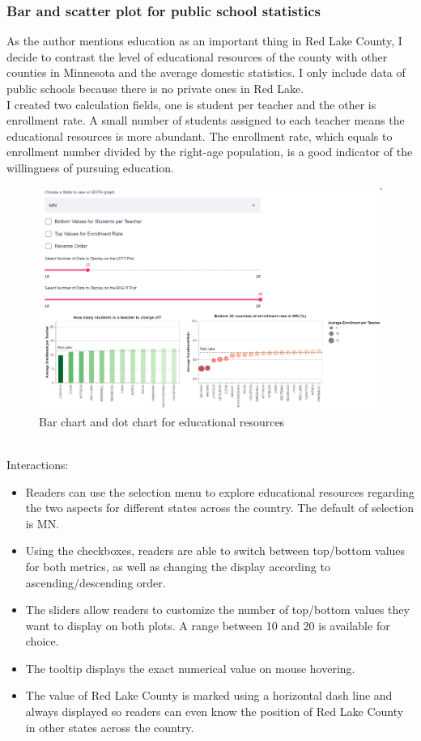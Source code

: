 \documentclass{article}
\begin{document}
\newpage
\subsubsection*{Bar and scatter plot for public school statistics}

As the author mentions education as an important thing in Red Lake County, I decide to contrast the level of educational resources of the county with other counties in Minnesota and the average domestic statistics. I only include data of public schools because there is no private ones in Red Lake. \\
\noindent
I created two calculation fields, one is student per teacher and the other is enrollment rate. A small number of students assigned to each teacher means the educational resources is more abundant. The enrollment rate, which equals to enrollment number divided by the right-age population, is a good indicator of the willingness of pursuing education. \\
\begin{figure}[htbp]
    \centering
    \includegraphics[scale=0.5]{v3.png}
    \caption{Bar chart and dot chart for educational resources}
\end{figure} \\
Interactions:
\begin{itemize}
    \item Readers can use the selection menu to explore educational resources regarding the two aspects for different states across the country. The default of selection is MN.
    \item Using the checkboxes, readers are able to switch between top/bottom values for both metrics, as well as changing the display according to ascending/descending order.
    \item The sliders allow readers to customize the number of top/bottom values they want to display on both plots. A range between 10 and 20 is available for choice.
    \item The tooltip displays the exact numerical value on mouse hovering.
    \item The value of Red Lake County is marked using a horizontal dash line and always displayed so readers can even know the position of Red Lake County in other states across the country. 
\end{itemize}
\end{document}
